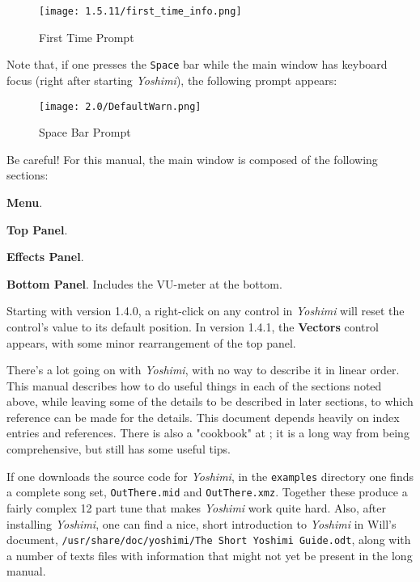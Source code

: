 \documentclass[
 11pt,
 twoside,
 a4paper,
 final                                 %
]{article}
\begin{document}
\begin{figure}[H]
   \centering
   \texttt{[image: 1.5.11/first\_time\_info.png]}
   \caption{First Time Prompt}
   \label{fig:first_time_info}
\end{figure}


   Note that, if one presses the \texttt{Space} bar while the main window has
   keyboard focus (right after starting \textsl{Yoshimi}), the following prompt
   appears:

\begin{figure}[H]
   \centering
   \texttt{[image: 2.0/DefaultWarn.png]}
   \caption{Space Bar Prompt}
   \label{fig:yoshimi_main_spacebar_prompt}
\end{figure}

   Be careful!
   For this manual, the main window is composed of the following sections:

\begin{enumber}
   \item \textbf{Menu}.
   \item \textbf{Top Panel}.
   \item \textbf{Effects Panel}.
   \item \textbf{Bottom Panel}.  Includes the VU-meter at the bottom.
\end{enumber}

   Starting with version 1.4.0, a right-click on any control in \textsl{Yoshimi}
   will reset the control's value to its default position.  In version 1.4.1, the \textbf{Vectors} control appears, with some minor rearrangement of the top panel.

   There's a lot going on with \textsl{Yoshimi}, with no way to describe
   it in linear order.  This manual describes how to do useful things in
   each of the sections noted above, while leaving some of the details to be
   described in later sections, to which reference can be made for the details.
   This document depends heavily on index entries and references.
   There is also a "cookbook" at \cite{book}; it is a long way from being
   comprehensive, but still has some useful tips.

   If one downloads the source code for \textsl{Yoshimi}, in the
   \texttt{examples} directory one finds a complete song set,
   \texttt{OutThere.mid} and \texttt{OutThere.xmz}. Together these produce a
   fairly complex 12 part tune that makes \textsl{Yoshimi} work quite hard.
   Also, after installing \textsl{Yoshimi}, one can find a nice, short
   introduction to \textsl{Yoshimi} in Will's document,
   \texttt{/usr/share/doc/yoshimi/The Short Yoshimi Guide.odt},
   along with a number of texts files with information that might not yet be
   present in the long manual.
\end{document}
